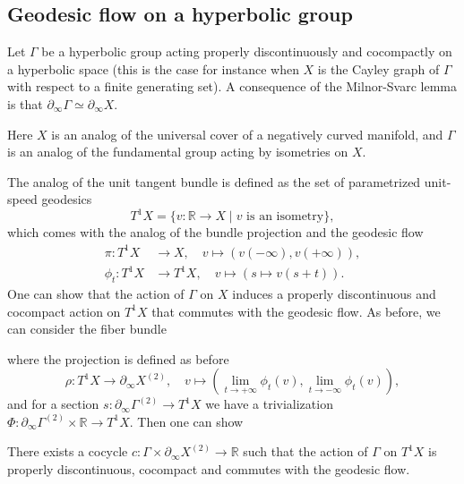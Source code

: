 \documentclass{report}
\begin{document}
\subsection{Geodesic flow on a hyperbolic group}
Let $\Gamma$ be a hyperbolic group acting properly discontinuously and cocompactly on a hyperbolic space (this is the case for instance when $X$ is the Cayley graph of $\Gamma$ with respect to a finite generating set).
A consequence of the Milnor-Svarc lemma is that $\partial_\infty \Gamma \simeq \partial_\infty X$.
\begin{remark}
    Here $X$ is an analog of the universal cover of a negatively curved manifold, and $\Gamma$ is an analog of the fundamental group acting by isometries on $X$.    
\end{remark}



The analog of the unit tangent bundle is defined as the set of parametrized unit-speed geodesics
\[
T^1 X = \{v : \mathbb R \to X \mid v \text{ is an isometry}\},
\]
which comes with the analog of the bundle projection and the geodesic flow 
\begin{align*}
    \pi: T^1 X &\to X, \quad v \mapsto (v(-\infty), v(+\infty)),\\
    \phi_t: T^1 X &\to T^1 X, \quad v \mapsto (s \mapsto v(s+t)).
\end{align*}
One can show that the action of $\Gamma$ on $X$ induces a properly discontinuous  and cocompact action on $T^1 X$ that commutes with the geodesic flow.
As before, we can consider the fiber bundle
\begin{center}
\end{center}
where the projection is defined as before
\[
\rho: T^1 X \to \partial_\infty X^{(2)}, \quad v \mapsto \left(\lim_{t \to +\infty} \phi_t(v), \lim_{t \to -\infty} \phi_t(v)\right),
\]
and for a section $s: \partial_\infty \Gamma^{(2)} \to T^1 X$ we have a trivialization $\Phi: \partial_\infty \Gamma^{(2)} \times \mathbb R \to T^1 X$.
Then one can show
\begin{fact}
    There exists a cocycle $c: \Gamma \times \partial_\infty X^{(2)} \to \mathbb R$ such that the action of $\Gamma$ on $T^1 X$ is properly discontinuous, cocompact and commutes with the geodesic flow.
\end{fact}
\end{document}
